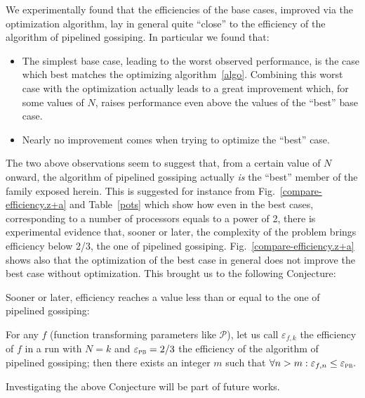 \documentclass{elsart}
\begin{document}
We experimentally found that the efficiencies of the base cases,
improved via the optimization algorithm, lay in general quite ``close'' to
the efficiency of the algorithm of pipelined gossiping.
In particular we found that:
\begin{itemize}
\item The simplest base case, leading to the worst observed performance, 
      is the case which best matches the optimizing algorithm~\ref{algo}. 
      Combining this worst case with the optimization actually leads to a great 
      improvement which, for some values of $N$, raises performance even 
      above the values of the ``best'' base case.
\item Nearly no improvement comes when trying to optimize 
      the ``best'' case.
\end{itemize}

The two above observations seem to suggest that, from
a certain value of $N$ onward, the algorithm of
pipelined gossiping actually \emph{is\/} the ``best'' member of the
family exposed herein. This is suggested for instance from 
Fig.~\ref{compare-efficiency.z+a} and Table~\ref{pots} which show how
even in the best cases, corresponding to a number of processors
equals to a power of 2, there is experimental evidence that,
sooner or later,
the complexity of the problem brings efficiency below 2/3,
the one of pipelined gossiping.
Fig.~\ref{compare-efficiency.z+a} 
shows also that the optimization of the best case in general
does not improve the best case without optimization.
This brought us to the following Conjecture:

Sooner or later, efficiency reaches a value less than or equal to
the one of pipelined gossiping:
\begin{conj}\label{23}
For any $f$ (function transforming parameters like $\mathcal P$),
let us call $\varepsilon_{f,k}$ the efficiency of $f$ in a run with $N=k$
and $\varepsilon_{\textsc{pb}} = 2/3$ the efficiency of the algorithm
of pipelined gossiping;
then there exists an integer $m$ such that 
	$\forall n>m: \varepsilon_{f,n} \leq \varepsilon_{\textsc{pb}}.$
\end{conj}



Investigating the above Conjecture will be part of future works.
\end{document}
